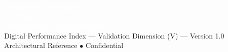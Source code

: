 \documentclass[11pt,a4paper]{article}
\begin{document}
\vspace{1cm}
\begin{tcolorbox}[enhanced, colback=dpiblue, colframe=dpiblue, boxrule=0pt, arc=2mm]
\begin{center}
\textcolor{white}{\textbf{\Large Document Developed By}}\\[0.15cm]
\textcolor{white}{\textbf{\Large AI Team}}\\[0.15cm]
\textcolor{white}{\textbf{\Large Malkapurapu Sivamanikanta}}\\[0.3cm]
\textcolor{dpicloud}{\small Digital Performance Index --- Validation Dimension (V) --- Version 1.0}\\[0.1cm]
\textcolor{dpicloud}{\small Architectural Reference $\bullet$ Confidential}
\end{center}
\end{tcolorbox}
\end{document}

